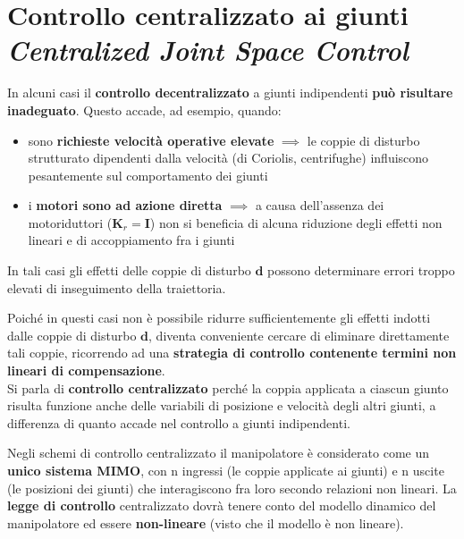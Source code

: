 \section[Controllo centralizzato ai giunti]{Controllo centralizzato ai giunti \\ \small \textit{Centralized Joint Space Control}}

In alcuni casi il \textbf{controllo decentralizzato} a giunti indipendenti \textbf{può risultare inadeguato}. Questo accade, ad esempio, quando:
\begin{itemize}
	\item sono \textbf{richieste velocità operative elevate} $\implies$ le coppie di disturbo strutturato dipendenti dalla velocità (di Coriolis, centrifughe) influiscono pesantemente sul comportamento dei giunti
	\item i \textbf{motori sono ad azione diretta} $\implies$ a causa dell’assenza dei motoriduttori ($\mathbf{K}_r = \mathbf{I}$) non si beneficia di alcuna riduzione degli effetti non lineari e di accoppiamento fra i giunti
\end{itemize}
 
In tali casi gli effetti delle coppie di disturbo $\mathbf{d}$ possono determinare errori troppo elevati di inseguimento della traiettoria.
 
Poiché in questi casi non è possibile ridurre sufficientemente gli effetti indotti dalle coppie di disturbo $\mathbf{d}$, diventa conveniente cercare di eliminare direttamente tali coppie, ricorrendo ad una \textbf{strategia di controllo contenente termini non lineari di compensazione}.\\
Si parla di \textbf{controllo centralizzato} perché la coppia applicata a ciascun giunto risulta funzione anche delle variabili di posizione e velocità degli altri giunti, a differenza di quanto accade nel controllo a giunti indipendenti.
 
Negli schemi di controllo centralizzato il manipolatore è considerato come un \textbf{unico sistema MIMO}, con n ingressi (le coppie applicate ai giunti) e n uscite (le posizioni dei giunti) che interagiscono fra loro secondo relazioni non lineari. La \textbf{legge di controllo} centralizzato dovrà tenere conto del modello dinamico del manipolatore ed essere \textbf{non-lineare} (visto che il modello è non lineare).
 
 
 
 
 


\vspace*{20pt}
